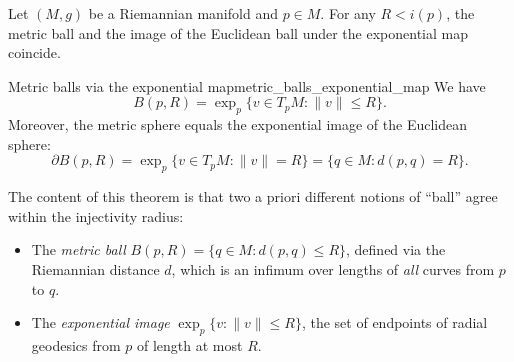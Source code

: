 Let $(M, g)$ be a Riemannian manifold and $p \in M$. For any $R < i(p)$, the metric ball and the image of the Euclidean ball under the exponential map coincide.

\begin{colorcor}{Metric balls via the exponential map}{metric_balls_exponential_map}
We have
\[
B(p, R) = \exp_p\{v \in T_pM : \|v\| \leqslant R\}.
\]
Moreover, the metric sphere equals the exponential image of the Euclidean sphere:
\[
\partial B(p, R) = \exp_p\{v \in T_pM : \|v\| = R\} = \{q \in M : d(p, q) = R\}.
\]
\end{colorcor}


The content of this theorem is that two a priori different notions of ``ball'' agree within the injectivity radius:
\begin{itemize}
    \item The \emph{metric ball} $B(p, R) = \{q \in M : d(p, q) \leqslant R\}$, defined via the Riemannian distance $d$, which is an infimum over lengths of \emph{all} curves from $p$ to $q$.
    \item The \emph{exponential image} $\exp_p\{v : \|v\| \leqslant R\}$, the set of endpoints of radial geodesics from $p$ of length at most $R$.
\end{itemize}




